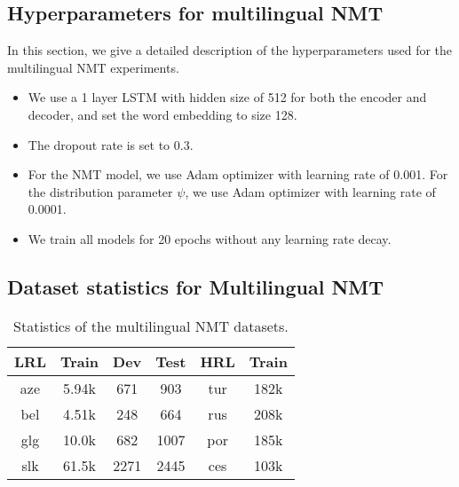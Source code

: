 \subsection{\label{app:nmt_hparam} Hyperparameters for multilingual NMT}
In this section, we give a detailed description of the hyperparameters used for the multilingual NMT experiments.
\begin{itemize}
    \item We use a 1 layer LSTM with hidden size of 512 for both the encoder and decoder, and set the word embedding to size 128.
    \item The dropout rate is set to 0.3.
    \item For the NMT model, we use Adam optimizer with learning rate of 0.001. For the distribution parameter $\psi$, we use Adam optimizer with learning rate of 0.0001.
    \item We train all models for 20 epochs without any learning rate decay.
\end{itemize}

\subsection{\label{app:nmt_data} Dataset statistics for Multilingual NMT}
\begin{table}[H]
  \centering
  \begin{tabular}{c|ccc|cc}
  \toprule
  \textbf{LRL} & \textbf{Train} & \textbf{Dev} & \textbf{Test} & \textbf{HRL} & \textbf{Train} \\
  \midrule
  aze & 5.94k &  671 &  903 & tur & 182k \\
  bel & 4.51k &  248 &  664 & rus & 208k \\
  glg & 10.0k &  682 & 1007 & por & 185k \\
  slk & 61.5k & 2271 & 2445 & ces & 103k \\
  \bottomrule
  \end{tabular}
  \vspace{0.2cm}
  \caption{\label{tab:nmt_data}Statistics of the multilingual NMT datasets.}
\end{table} 

